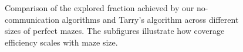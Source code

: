 \begin{figure}[H]
    \centering
    \qquad
    \qquad
    \newline
    \qquad
    \newline
    \qquad
    \caption{Comparison of the explored fraction achieved by our no-communication algorithms and Tarry's algorithm across different sizes of perfect mazes. The subfigures illustrate how coverage efficiency scales with maze size.}
    \label{fig_no_comm_fraction_all_sizes_maze}
\end{figure}

